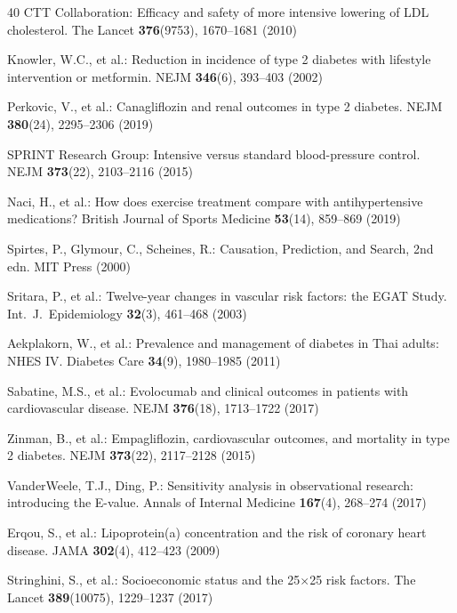 \documentclass[runningheads]{llncs}
\begin{document}
\begin{thebibliography}{40}
CTT Collaboration:
Efficacy and safety of more intensive lowering of LDL cholesterol.
The Lancet \textbf{376}(9753), 1670--1681 (2010)

Knowler, W.C., et al.:
Reduction in incidence of type 2 diabetes with lifestyle intervention or metformin.
NEJM \textbf{346}(6), 393--403 (2002)

Perkovic, V., et al.:
Canagliflozin and renal outcomes in type 2 diabetes.
NEJM \textbf{380}(24), 2295--2306 (2019)

SPRINT Research Group:
Intensive versus standard blood-pressure control.
NEJM \textbf{373}(22), 2103--2116 (2015)

Naci, H., et al.:
How does exercise treatment compare with antihypertensive medications?
British Journal of Sports Medicine \textbf{53}(14), 859--869 (2019)

Spirtes, P., Glymour, C., Scheines, R.:
Causation, Prediction, and Search, 2nd edn.
MIT Press (2000)

Sritara, P., et al.:
Twelve-year changes in vascular risk factors: the EGAT Study.
Int.\ J.\ Epidemiology \textbf{32}(3), 461--468 (2003)

Aekplakorn, W., et al.:
Prevalence and management of diabetes in Thai adults: NHES IV.
Diabetes Care \textbf{34}(9), 1980--1985 (2011)

Sabatine, M.S., et al.:
Evolocumab and clinical outcomes in patients with cardiovascular disease.
NEJM \textbf{376}(18), 1713--1722 (2017)

Zinman, B., et al.:
Empagliflozin, cardiovascular outcomes, and mortality in type 2 diabetes.
NEJM \textbf{373}(22), 2117--2128 (2015)

VanderWeele, T.J., Ding, P.:
Sensitivity analysis in observational research: introducing the E-value.
Annals of Internal Medicine \textbf{167}(4), 268--274 (2017)

Erqou, S., et al.:
Lipoprotein(a) concentration and the risk of coronary heart disease.
JAMA \textbf{302}(4), 412--423 (2009)

Stringhini, S., et al.:
Socioeconomic status and the 25$\times$25 risk factors.
The Lancet \textbf{389}(10075), 1229--1237 (2017)


\end{thebibliography}
\end{document}
